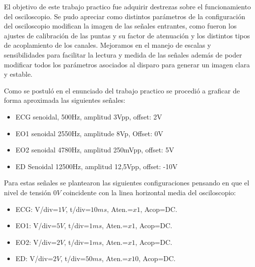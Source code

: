 El objetivo de este trabajo practico fue adquirir destrezas sobre el funcionamiento del osciloscopio. Se pudo apreciar como distintos parámetros de la configuración del osciloscopio modifican la imagen de las señales entrantes, como fueron los ajustes de calibración de las puntas y su factor de atenuación y los distintos tipos de acoplamiento de los canales. Mejoramos en el manejo de escalas y sensibilidades para facilitar la lectura y medida de las señales además de poder modificar todos los parámetros asociados al disparo para generar un imagen clara y estable.

Como se postuló en el enunciado del trabajo practico se procedió a graficar de forma aproximada las siguientes señales:
\begin{itemize}
    \item ECG senoidal, 500Hz, amplitud 3Vpp, offset: 2V
    \item EO1 senoidal 2550Hz, amplitude 8Vp, Offset: 0V
    \item EO2 senoidal 4780Hz, amplitud 250mVpp, offset: 5V
    \item ED Senoidal 12500Hz, amplitud 12,5Vpp, offset: -10V 
\end{itemize}
Para estas señales se plantearon las siguientes configuraciones pensando en que el nivel de tensión $0V$ coincidente con la linea horizontal media del osciloscopio:
\begin{itemize}
    \item ECG: V/div=$1V$, t/div=$10 ms$, Aten.=$x1$, Acop=DC.
    \item EO1: V/div=$5V$, t/div=$1 ms$, Aten.=$x1$, Acop=DC.
    \item EO2: V/div=$2V$, t/div=$1 ms$, Aten.=$x1$, Acop=DC.
    \item ED: V/div=$2V$, t/div=$50 ms$, Aten.=$x10$, Acop=DC.
\end{itemize}

